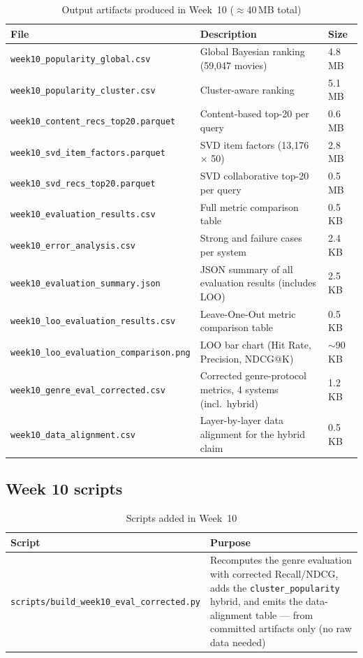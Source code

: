 \documentclass[12pt,a4paper]{article}
\begin{document}
\begin{table}[H]
\centering
\caption{Output artifacts produced in Week~10 ($\approx$40\,MB total)}
\begin{tabular}{lll}
\toprule
\textbf{File} & \textbf{Description} & \textbf{Size} \\
\midrule
\texttt{week10\_popularity\_global.csv}    & Global Bayesian ranking (59,047 movies) & 4.8 MB \\
\texttt{week10\_popularity\_cluster.csv}   & Cluster-aware ranking                   & 5.1 MB \\
\texttt{week10\_content\_recs\_top20.parquet} & Content-based top-20 per query        & 0.6 MB \\
\texttt{week10\_svd\_item\_factors.parquet}   & SVD item factors (13,176 × 50)        & 2.8 MB \\
\texttt{week10\_svd\_recs\_top20.parquet}     & SVD collaborative top-20 per query    & 0.5 MB \\
\texttt{week10\_evaluation\_results.csv}   & Full metric comparison table            & 0.5 KB \\
\texttt{week10\_error\_analysis.csv}       & Strong and failure cases per system     & 2.4 KB \\
\texttt{week10\_evaluation\_summary.json}  & JSON summary of all evaluation results (includes LOO)  & 2.5 KB \\
\texttt{week10\_loo\_evaluation\_results.csv} & Leave-One-Out metric comparison table & 0.5 KB \\
\texttt{week10\_loo\_evaluation\_comparison.png} & LOO bar chart (Hit Rate, Precision, NDCG@K) & $\sim$90 KB \\
\texttt{week10\_genre\_eval\_corrected.csv} & Corrected genre-protocol metrics, 4 systems (incl.\ hybrid) & 1.2 KB \\
\texttt{week10\_data\_alignment.csv}       & Layer-by-layer data alignment for the hybrid claim & 0.5 KB \\
\bottomrule
\end{tabular}
\end{table}

\subsection{Week 10 scripts}

\begin{table}[H]
\centering
\caption{Scripts added in Week~10}
\begin{tabular}{lp{7.2cm}}
\toprule
\textbf{Script} & \textbf{Purpose} \\
\midrule
\texttt{scripts/build\_week10\_eval\_corrected.py} & Recomputes the genre evaluation with corrected Recall/NDCG, adds the \texttt{cluster\_popularity} hybrid, and emits the data-alignment table --- from committed artifacts only (no raw data needed) \\
\bottomrule
\end{tabular}
\end{table}
\end{document}
